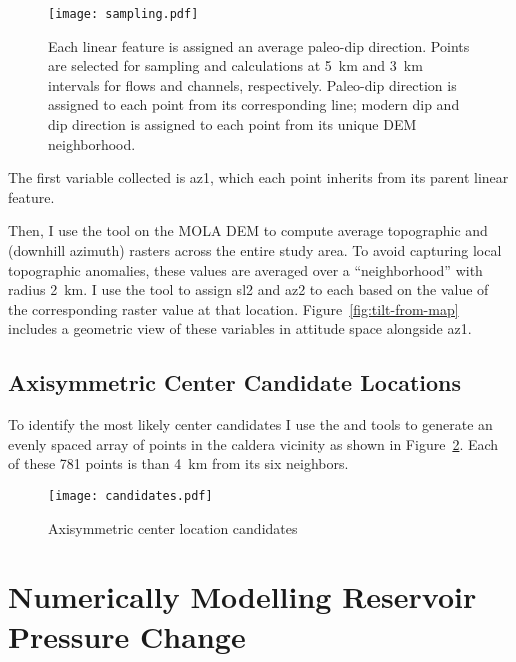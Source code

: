\begin{figure}
    \centering
    \texttt{[image: sampling.pdf]}
    \caption[Sampling site selection]{Each linear feature is assigned an average paleo-dip direction. Points are selected for sampling and calculations at \qty{5}{\km} and \qty{3}{\km} intervals for flows and channels, respectively. Paleo-dip direction is assigned to each point from its corresponding line; modern dip and dip direction is assigned to each point from its unique \ac{DEM} neighborhood.}%
    \label{fig:sampling}
\end{figure}

\newcommand{\neighborhood}{\qty{2}{\km}}

The first variable collected is \ac{az1}, which each point inherits from its parent linear feature.

Then, I use the  tool on the \ac{MOLA} \ac{DEM} to compute average topographic  and  (downhill azimuth) rasters across the entire study area. To avoid capturing local topographic anomalies, these values are averaged over a ``neighborhood'' with radius \neighborhood. I use the  tool to assign \ac{sl2} and \ac{az2} to each based on the value of the corresponding raster value at that location. Figure~\ref{fig:tilt-from-map} includes a geometric view of these variables in attitude space alongside \acs{az1}.

\subsection{Axisymmetric Center Candidate Locations}

To identify the most likely center candidates I use the  and  tools to generate an evenly spaced array of points in the caldera vicinity as shown in Figure~\ref{fig:candidates}. Each of these 781 points is than \qty{4}{\km} from its six neighbors.

\begin{figure}
    \texttt{[image: candidates.pdf]}%
    \caption{Axisymmetric center location candidates}%
    \label{fig:candidates}
\end{figure}

\section{Numerically Modelling Reservoir Pressure Change}\label{sec:modelling}

